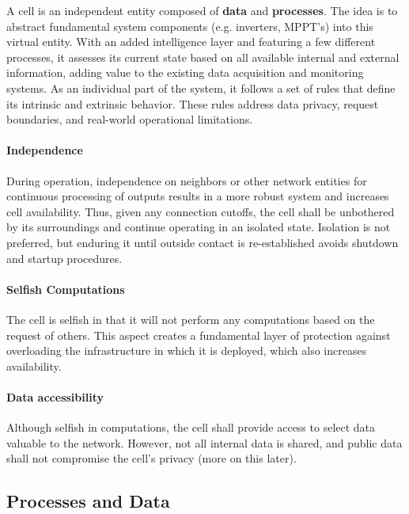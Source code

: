 A cell is an independent entity composed of \textbf{data} and \textbf{processes}. The idea is to abstract fundamental system components (e.g. inverters, MPPT's) into this virtual entity. With an added intelligence layer and featuring a few different processes, it assesses its current state based on all available internal and external information, adding value to the existing data acquisition and monitoring systems. As an individual part of the system, it follows a set of rules that define its intrinsic and extrinsic behavior. These rules address data privacy, request boundaries, and real-world operational limitations.

\paragraph*{Independence} During operation, independence on neighbors or other network entities for continuous processing of outputs results in a more robust system and increases cell availability. Thus, given any connection cutoffs, the cell shall be unbothered by its surroundings and continue operating in an isolated state. Isolation is not preferred, but enduring it until outside contact is re-established avoids shutdown and startup procedures.

\paragraph*{Selfish Computations} The cell is selfish in that it will not perform any computations based on the request of others. This aspect creates a fundamental layer of protection against overloading the infrastructure in which it is deployed, which also increases availability.

\paragraph*{Data accessibility} Although selfish in computations, the cell shall provide access to select data valuable to the network. However, not all internal data is shared, and public data shall not compromise the cell's privacy (more on this later).

\subsection{Processes and Data}

